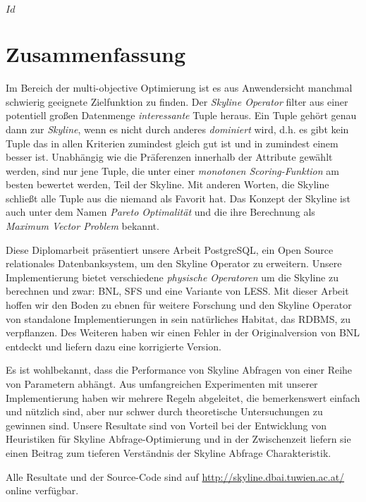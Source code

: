 
\svnInfo $Id$


\chapter*{Zusammenfassung\revision}


Im Bereich der multi-objective Optimierung ist es aus Anwendersicht
manchmal schwierig geeignete Zielfunktion zu finden.
%
Der \emph{Skyline Operator} filter aus einer potentiell gro\ss{}en
Datenmenge \emph{interessante} Tuple heraus.
%
Ein Tuple geh\"ort genau dann zur \emph{Skyline}, wenn es nicht durch
anderes \emph{dominiert} wird, d.h. es gibt kein Tuple das in allen
Kriterien zumindest gleich gut ist und in zumindest einem besser ist.
%
Unabh\"angig wie die Pr\"aferenzen innerhalb der Attribute gew\"ahlt
werden, sind nur jene Tuple, die unter einer \emph{monotonen
Scoring-Funktion} am besten bewertet werden, Teil der Skyline.
%
Mit anderen Worten, die Skyline schlie\ss{}t alle Tuple aus die
niemand als Favorit hat.
%
Das Konzept der Skyline ist auch unter dem Namen \emph{Pareto
Optimalit\"at} und die ihre Berechnung als \emph{Maximum Vector
Problem} bekannt.


Diese Diplomarbeit pr\"asentiert unsere Arbeit PostgreSQL, ein Open
Source relationales Datenbanksystem, um den Skyline Operator zu
erweitern.
%
Unsere Implementierung bietet verschiedene \emph{physische Operatoren}
um die Skyline zu berechnen und zwar: BNL, SFS und eine Variante von
LESS.
%
Mit dieser Arbeit hoffen wir den Boden zu ebnen f\"ur weitere
Forschung und den Skyline Operator von standalone Implementierungen in
sein nat\"urliches Habitat, das RDBMS, zu verpflanzen.
%
Des Weiteren haben wir einen Fehler in der Originalversion von BNL
entdeckt und liefern dazu eine korrigierte Version.


Es ist wohlbekannt, dass die Performance von Skyline Abfragen von einer
Reihe von Parametern abh\"angt.
%
Aus umfangreichen Experimenten mit unserer Implementierung haben wir
mehrere Regeln abgeleitet, die bemerkenswert einfach und n\"utzlich
sind, aber nur schwer durch theoretische Untersuchungen zu gewinnen
sind.
%
Unsere Resultate sind von Vorteil bei der Entwicklung von Heuristiken
f\"ur Skyline Abfrage-Optimierung und in der Zwischenzeit liefern sie
einen Beitrag zum tieferen Verst\"andnis der Skyline Abfrage
Charakteristik.


Alle Resultate und der Source-Code sind auf
\url{http://skyline.dbai.tuwien.ac.at/} online verf\"ugbar.
